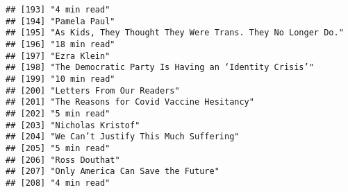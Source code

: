 \documentclass[
]{article}
\begin{document}
\begin{verbatim}
## [193] "4 min read"                                                                                                                                               
## [194] "Pamela Paul"                                                                                                                                              
## [195] "As Kids, They Thought They Were Trans. They No Longer Do."                                                                                                
## [196] "18 min read"                                                                                                                                              
## [197] "Ezra Klein"                                                                                                                                               
## [198] "The Democratic Party Is Having an ‘Identity Crisis’"                                                                                                      
## [199] "10 min read"                                                                                                                                              
## [200] "Letters From Our Readers"                                                                                                                                 
## [201] "The Reasons for Covid Vaccine Hesitancy"                                                                                                                  
## [202] "5 min read"                                                                                                                                               
## [203] "Nicholas Kristof"                                                                                                                                         
## [204] "We Can’t Justify This Much Suffering"                                                                                                                     
## [205] "5 min read"                                                                                                                                               
## [206] "Ross Douthat"                                                                                                                                             
## [207] "Only America Can Save the Future"                                                                                                                         
## [208] "4 min read"                                                                                                                                               

\end{verbatim}
\end{document}
